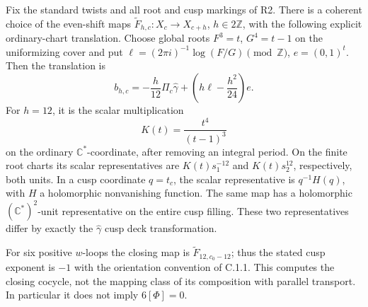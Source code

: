 \begin{proposition}
Fix the standard twists and all root and cusp markings of R2.
There is a coherent choice of the even-shift maps
\(\widetilde F_{h,c}:X_c\to X_{c+h}\), \(h\in2\mathbb Z\),
with the following explicit ordinary-chart translation. Choose global
roots \(F^3=t\), \(G^4=t-1\) on the uniformizing cover and put
\(\ell=(2\pi i)^{-1}\log(F/G)\pmod{\mathbb Z}\), \(e=(0,1)^t\).
Then the translation is
\begin{equation}\label{eq:C-explicit-closing}
 b_{h,c}=-\frac h{12}\Pi_c\widehat\gamma
              +\left(h\ell-\frac{h^2}{24}\right)e.
\end{equation}
For \(h=12\), it is the scalar multiplication
\begin{equation}\label{eq:C-twelve-scalar}
 K(t)=\frac{t^4}{(t-1)^3}
\end{equation}
on the ordinary \(\mathbb C^*\)-coordinate, after removing an integral
period. On the finite root charts its scalar representatives are
\(K(t)s_1^{-12}\) and \(K(t)s_2^{12}\), respectively, both units.
In a cusp coordinate \(q=t_c\), the scalar representative is
\(q^{-1}H(q)\), with \(H\) a holomorphic nonvanishing function.
The same map has a holomorphic \((\mathbb C^*)^2\)-unit representative
on the entire cusp filling. These two representatives differ by
exactly the \(\widehat\gamma\) cusp deck transformation.

For six positive \(w\)-loops the closing map is
\(\widetilde F_{12,c_0-12}\); thus the stated cusp exponent is \(-1\)
with the orientation convention of C.1.1. This computes the closing
cocycle, not the mapping class of its composition with parallel
transport. In particular it does not imply \(6[\Phi]=0\).
\end{proposition}
